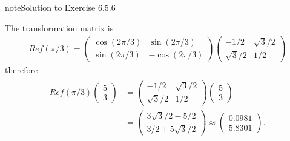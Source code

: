 \documentclass[letterpaper,10pt,english]{jupyterBook}
\begin{document}
\begin{sphinxadmonition}{note}{Solution to Exercise 6.5.6}



\sphinxAtStartPar
The transformation matrix is
\begin{equation*}
\begin{split} Re\!f \left(\pi/3\right) =
\begin{pmatrix} 
    \cos(2\pi/3) & \sin(2\pi/3) \\
    \sin(2\pi/3) & -\cos(2\pi/3)
\end{pmatrix}
\begin{pmatrix}
    -1/2 & \sqrt{3}/2 \\
    \sqrt{3}/2 & 1/2
\end{pmatrix} \end{split}
\end{equation*}
\sphinxAtStartPar
therefore
\begin{equation*}
\begin{split} \begin{align*}
Re\!f \left(\pi/3\right)
\begin{pmatrix} 5 \\ 3 \end{pmatrix} 
&= \begin{pmatrix}
    -1/2 & \sqrt{3}/2 \\
    \sqrt{3}/2 & 1/2
\end{pmatrix} 
\begin{pmatrix} 5 \\ 3 \end{pmatrix} \\
&= 
\begin{pmatrix} 3\sqrt{3}/2 - 5/2 \\ 3/2 + 5\sqrt{3}/2 \end{pmatrix} 
\approx \begin{pmatrix} 0.0981 \\ 5.8301 \end{pmatrix}.
\end{align*} \end{split}
\end{equation*}\end{sphinxadmonition}
 \label{_pages/A6_Linear_transformations_exercises_solutions:_pages/A6_Linear_transformations_exercises_solutions-solution-6}
\end{document}
